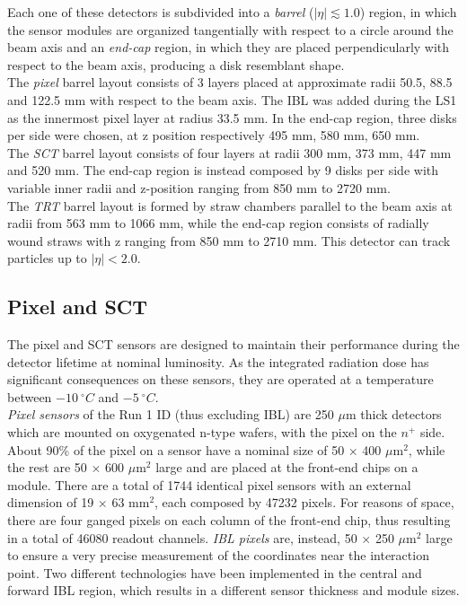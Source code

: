 \documentclass[a4paper,twoside,12pt]{book}
\begin{document}
Each one of these detectors is subdivided into a \textit{barrel} ($|\eta| \lesssim 1.0$) region, in which the sensor modules 
are organized tangentially with respect to a circle around the beam axis and an \textit{end-cap} region, in which they are placed perpendicularly with respect to the beam axis, producing
a disk resemblant shape.\\

The \textit{pixel} barrel layout consists of 3 layers placed at approximate radii 50.5, 88.5 and 122.5 mm with respect to the beam 
axis. The IBL was added during the LS1 as the
innermost pixel layer at radius 33.5 mm. In the end-cap region, three disks per side were chosen,
at z position respectively 495 mm, 580 mm, 650 mm. \\

The \textit{SCT} barrel layout consists of four layers at radii 300 mm, 373 mm, 447 mm and 520 mm. The end-cap region is instead composed by 9 disks per side with variable
inner radii and z-position ranging from 850 mm to 2720 mm. \\

The \textit{TRT} barrel layout is formed by straw chambers parallel to the beam axis at radii from 563 mm to 1066 mm,
while the end-cap region consists of radially wound straws with z ranging from 850 mm to 
2710 mm. This detector can track particles up to $|\eta| < 2.0$.

\subsection*{Pixel and SCT}

The pixel and SCT sensors are designed to maintain their performance during the detector
lifetime at nominal luminosity\cite{Aad:2008zzm}. As the integrated radiation dose has significant consequences
on these sensors, they are operated at a temperature between $-10\ ^{\circ}C$ and $-5\ ^{\circ}C$.\\

\textit{Pixel sensors} of the Run 1 ID (thus excluding IBL) are 250 $\mu$m thick detectors which are mounted on oxygenated n-type wafers, with the pixel on the $n^+$ side. About 90\% of the pixel on a sensor have a nominal 
size of 50 $\times$ 400 $\mu$m$^2$, while the rest are 50 $\times$ 600 $\mu$m$^2$ large and are placed
at the front-end chips on a module. There are a total of 1744 identical pixel sensors with an external dimension of 19 $\times$ 63 mm$^2$, each composed by 47232 pixels. For reasons of space, there are four ganged pixels on each column of the front-end chip, thus resulting in a total of 46080 readout channels. \textit{IBL pixels} are, instead, 50 $\times$ 250 $\mu$m$^2$ large to 
ensure a very precise measurement of the coordinates near the interaction point\cite{IBL}. Two 
different technologies have been implemented in the central and forward IBL region, which
results in a different sensor thickness and module sizes.\\
\end{document}
